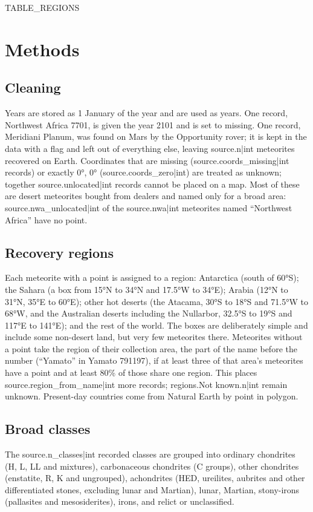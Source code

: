 \documentclass[11pt,a4paper]{article}
\begin{document}
{{TABLE_REGIONS}}

\section{Methods}
\subsection{Cleaning}
Years are stored as 1 January of the year and are used as years. One record, Northwest Africa 7701, is given the year 2101 and is set to missing. One record, Meridiani Planum, was found on Mars by the Opportunity rover; it is kept in the data with a flag and left out of everything else, leaving {{source.n|int}} meteorites recovered on Earth. Coordinates that are missing ({{source.coords_missing|int}} records) or exactly 0°, 0° ({{source.coords_zero|int}}) are treated as unknown; together {{source.unlocated|int}} records cannot be placed on a map. Most of these are desert meteorites bought from dealers and named only for a broad area: {{source.nwa_unlocated|int}} of the {{source.nwa|int}} meteorites named ``Northwest Africa'' have no point.

\subsection{Recovery regions}
Each meteorite with a point is assigned to a region: Antarctica (south of 60°S); the Sahara (a box from 15°N to 34°N and 17.5°W to 34°E); Arabia (12°N to 31°N, 35°E to 60°E); other hot deserts (the Atacama, 30°S to 18°S and 71.5°W to 68°W, and the Australian deserts including the Nullarbor, 32.5°S to 19°S and 117°E to 141°E); and the rest of the world. The boxes are deliberately simple and include some non-desert land, but very few meteorites there. Meteorites without a point take the region of their collection area, the part of the name before the number (``Yamato'' in Yamato 791197), if at least three of that area's meteorites have a point and at least 80\% of those share one region. This places {{source.region_from_name|int}} more records; {{regions.Not known.n|int}} remain unknown. Present-day countries come from Natural Earth by point in polygon.

\subsection{Broad classes}
The {{source.n_classes|int}} recorded classes are grouped into ordinary chondrites (H, L, LL and mixtures), carbonaceous chondrites (C groups), other chondrites (enstatite, R, K and ungrouped), achondrites (HED, ureilites, aubrites and other differentiated stones, excluding lunar and Martian), lunar, Martian, stony-irons (pallasites and mesosiderites), irons, and relict or unclassified.
\end{document}
